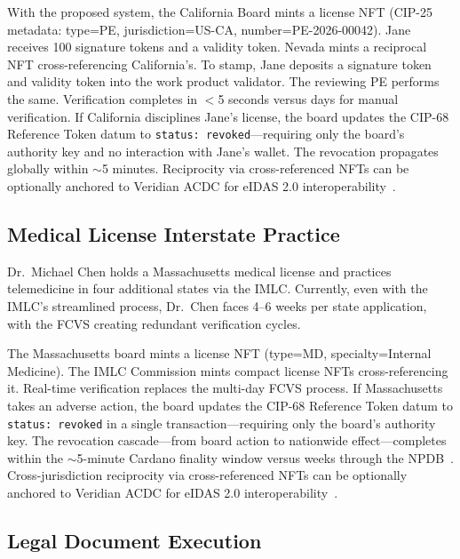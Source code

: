 \documentclass[conference,10pt]{IEEEtran}
\begin{document}
With the proposed system, the California Board mints a license NFT (CIP-25 metadata: type=PE, jurisdiction=US-CA, number=PE-2026-00042). Jane receives 100 signature tokens and a validity token. Nevada mints a reciprocal NFT cross-referencing California's. To stamp, Jane deposits a signature token and validity token into the work product validator. The reviewing PE performs the same. Verification completes in $<$5 seconds versus days for manual verification. If California disciplines Jane's license, the board updates the CIP-68 Reference Token datum to \texttt{status: revoked}---requiring only the board's authority key and no interaction with Jane's wallet. The revocation propagates globally within $\sim$5 minutes. Reciprocity via cross-referenced NFTs can be optionally anchored to Veridian ACDC for eIDAS 2.0 interoperability~\cite{veridian2025}.

\subsection{Medical License Interstate Practice}

Dr.~Michael Chen holds a Massachusetts medical license and practices telemedicine in four additional states via the IMLC. Currently, even with the IMLC's streamlined process, Dr.~Chen faces 4--6 weeks per state application, with the FCVS creating redundant verification cycles.

The Massachusetts board mints a license NFT (type=MD, specialty=Internal Medicine). The IMLC Commission mints compact license NFTs cross-referencing it. Real-time verification replaces the multi-day FCVS process. If Massachusetts takes an adverse action, the board updates the CIP-68 Reference Token datum to \texttt{status: revoked} in a single transaction---requiring only the board's authority key. The revocation cascade---from board action to nationwide effect---completes within the $\sim$5-minute Cardano finality window versus weeks through the NPDB~\cite{npdb2024,imlc2025}. Cross-jurisdiction reciprocity via cross-referenced NFTs can be optionally anchored to Veridian ACDC for eIDAS 2.0 interoperability~\cite{veridian2025}.

\subsection{Legal Document Execution}
\end{document}
